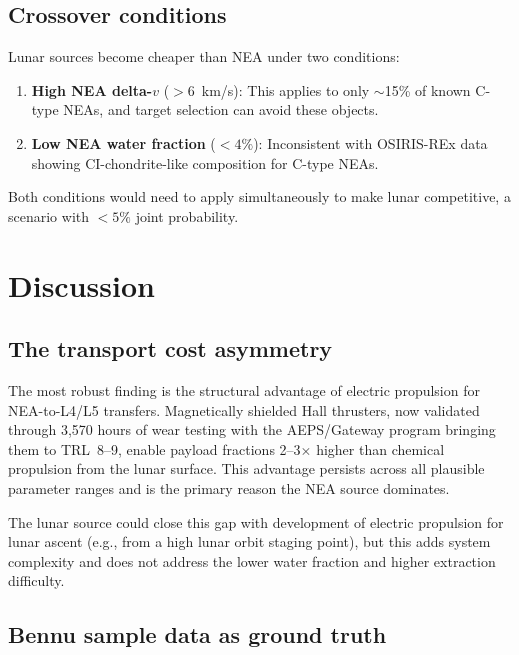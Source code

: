\documentclass[preprint,12pt]{elsarticle}
\begin{document}
\subsection{Crossover conditions}

Lunar sources become cheaper than NEA under two conditions:
\begin{enumerate}
    \item \textbf{High NEA delta-$v$} ($> 6$~km/s): This applies to only $\sim$15\% of known C-type NEAs, and target selection can avoid these objects.
    \item \textbf{Low NEA water fraction} ($< 4\%$): Inconsistent with OSIRIS-REx data showing CI-chondrite-like composition for C-type NEAs.
\end{enumerate}

Both conditions would need to apply simultaneously to make lunar competitive, a scenario with $<5\%$ joint probability.

\section{Discussion}
\label{sec:discussion}

\subsection{The transport cost asymmetry}

The most robust finding is the structural advantage of electric propulsion for NEA-to-L4/L5 transfers. Magnetically shielded Hall thrusters, now validated through 3,570 hours of wear testing \cite{frieman2019} with the AEPS/Gateway program bringing them to TRL~8--9, enable payload fractions 2--3$\times$ higher than chemical propulsion from the lunar surface. This advantage persists across all plausible parameter ranges and is the primary reason the NEA source dominates.

The lunar source could close this gap with development of electric propulsion for lunar ascent (e.g., from a high lunar orbit staging point), but this adds system complexity and does not address the lower water fraction and higher extraction difficulty.

\subsection{Bennu sample data as ground truth}
\end{document}
